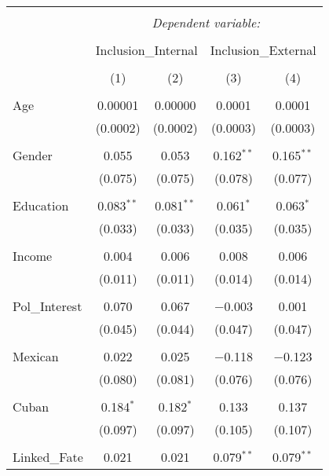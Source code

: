 
\begin{table}[!htbp] \centering 
  \caption{} 
  \label{} 
\begin{tabular}{@{\extracolsep{5pt}}lcccc} 
\\[-1.8ex]\hline 
\hline \\[-1.8ex] 
 & \multicolumn{4}{c}{\textit{Dependent variable:}} \\ 
\cline{2-5} 
\\[-1.8ex] & \multicolumn{2}{c}{Inclusion\_Internal} & \multicolumn{2}{c}{Inclusion\_External} \\ 
\\[-1.8ex] & (1) & (2) & (3) & (4)\\ 
\hline \\[-1.8ex] 
 Age & 0.00001 & 0.00000 & 0.0001 & 0.0001 \\ 
  & (0.0002) & (0.0002) & (0.0003) & (0.0003) \\ 
  & & & & \\ 
 Gender & 0.055 & 0.053 & 0.162$^{**}$ & 0.165$^{**}$ \\ 
  & (0.075) & (0.075) & (0.078) & (0.077) \\ 
  & & & & \\ 
 Education & 0.083$^{**}$ & 0.081$^{**}$ & 0.061$^{*}$ & 0.063$^{*}$ \\ 
  & (0.033) & (0.033) & (0.035) & (0.035) \\ 
  & & & & \\ 
 Income & 0.004 & 0.006 & 0.008 & 0.006 \\ 
  & (0.011) & (0.011) & (0.014) & (0.014) \\ 
  & & & & \\ 
 Pol\_Interest & 0.070 & 0.067 & $-$0.003 & 0.001 \\ 
  & (0.045) & (0.044) & (0.047) & (0.047) \\ 
  & & & & \\ 
 Mexican & 0.022 & 0.025 & $-$0.118 & $-$0.123 \\ 
  & (0.080) & (0.081) & (0.076) & (0.076) \\ 
  & & & & \\ 
 Cuban & 0.184$^{*}$ & 0.182$^{*}$ & 0.133 & 0.137 \\ 
  & (0.097) & (0.097) & (0.105) & (0.107) \\ 
  & & & & \\ 
 Linked\_Fate & 0.021 & 0.021 & 0.079$^{**}$ & 0.079$^{**}$ \\ 

\end{tabular}
\end{table}
